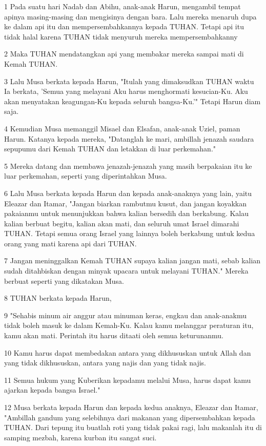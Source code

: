 \par 1 Pada suatu hari Nadab dan Abihu, anak-anak Harun, mengambil tempat apinya masing-masing dan mengisinya dengan bara. Lalu mereka menaruh dupa ke dalam api itu dan mempersembahkannya kepada TUHAN. Tetapi api itu tidak halal karena TUHAN tidak menyuruh mereka mempersembahkanny
\par 2 Maka TUHAN mendatangkan api yang membakar mereka sampai mati di Kemah TUHAN.
\par 3 Lalu Musa berkata kepada Harun, "Itulah yang dimaksudkan TUHAN waktu Ia berkata, 'Semua yang melayani Aku harus menghormati kesucian-Ku. Aku akan menyatakan keagungan-Ku kepada seluruh bangsa-Ku.'" Tetapi Harun diam saja.
\par 4 Kemudian Musa memanggil Misael dan Elsafan, anak-anak Uziel, paman Harun. Katanya kepada mereka, "Datanglah ke mari, ambillah jenazah saudara sepupumu dari Kemah TUHAN dan letakkan di luar perkemahan."
\par 5 Mereka datang dan membawa jenazah-jenazah yang masih berpakaian itu ke luar perkemahan, seperti yang diperintahkan Musa.
\par 6 Lalu Musa berkata kepada Harun dan kepada anak-anaknya yang lain, yaitu Eleazar dan Itamar, "Jangan biarkan rambutmu kusut, dan jangan koyakkan pakaianmu untuk menunjukkan bahwa kalian bersedih dan berkabung. Kalau kalian berbuat begitu, kalian akan mati, dan seluruh umat Israel dimarahi TUHAN. Tetapi semua orang Israel yang lainnya boleh berkabung untuk kedua orang yang mati karena api dari TUHAN.
\par 7 Jangan meninggalkan Kemah TUHAN supaya kalian jangan mati, sebab kalian sudah ditahbiskan dengan minyak upacara untuk melayani TUHAN." Mereka berbuat seperti yang dikatakan Musa.
\par 8 TUHAN berkata kepada Harun,
\par 9 "Sehabis minum air anggur atau minuman keras, engkau dan anak-anakmu tidak boleh masuk ke dalam Kemah-Ku. Kalau kamu melanggar peraturan itu, kamu akan mati. Perintah itu harus ditaati oleh semua keturunanmu.
\par 10 Kamu harus dapat membedakan antara yang dikhususkan untuk Allah dan yang tidak dikhususkan, antara yang najis dan yang tidak najis.
\par 11 Semua hukum yang Kuberikan kepadamu melalui Musa, harus dapat kamu ajarkan kepada bangsa Israel."
\par 12 Musa berkata kepada Harun dan kepada kedua anaknya, Eleazar dan Itamar, "Ambillah gandum yang selebihnya dari makanan yang dipersembahkan kepada TUHAN. Dari tepung itu buatlah roti yang tidak pakai ragi, lalu makanlah itu di samping mezbah, karena kurban itu sangat suci.
